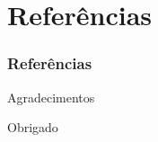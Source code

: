 \documentclass{beamer}
\begin{document}
\section{Referências}
\begin{frame}[allowframebreaks]
\frametitle{Referências}


\end{frame}


\begin{frame}{Agradecimentos}
    \begin{center}
        \Huge Obrigado
    \end{center}
\end{frame}

\end{document}
